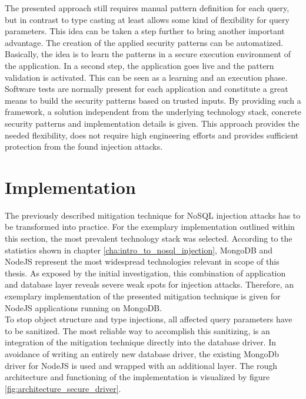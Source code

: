 The presented approach still requires manual pattern definition for each query, but in contrast to type casting at least allows some kind of flexibility for query parameters. This idea can be taken a step further to bring another important advantage. The creation of the applied security patterns can be automatized. Basically, the idea is to learn the patterns in a secure execution environment of the application. In a second step, the application goes live and the pattern validation is activated. This can be seen as a learning and an execution phase. Software tests are normally present for each application and constitute a great means to build the security patterns based on trusted inputs. By providing such a framework, a solution independent from the underlying technology stack, concrete security patterns and implementation details is given. This approach provides the needed flexibility, does not require high engineering efforts and provides sufficient protection from the found injection attacks.

\section{Implementation}
The previously described mitigation technique for NoSQL injection attacks has to be transformed into practice. For the exemplary implementation outlined within this section, the most prevalent technology stack was selected. According to the statistics shown in chapter \ref{cha:intro_to_nosql_injection}, MongoDB and NodeJS represent the most widespread technologies relevant in scope of this thesis. As exposed by the initial investigation, this combination of application and database layer reveals severe weak spots for injection attacks. Therefore, an exemplary implementation of the presented mitigation technique is given for NodeJS applications running on MongoDB. \\ 

To stop object structure and type injections, all affected query parameters have to be sanitized. The most reliable way to accomplish this sanitizing, is an integration of the mitigation technique directly into the database driver. In avoidance of writing an entirely new database driver, the existing MongoDb driver for NodeJS is used and wrapped with an additional layer. The rough architecture and functioning of the implementation is visualized by figure \ref{fig:architecture_secure_driver}. \\

